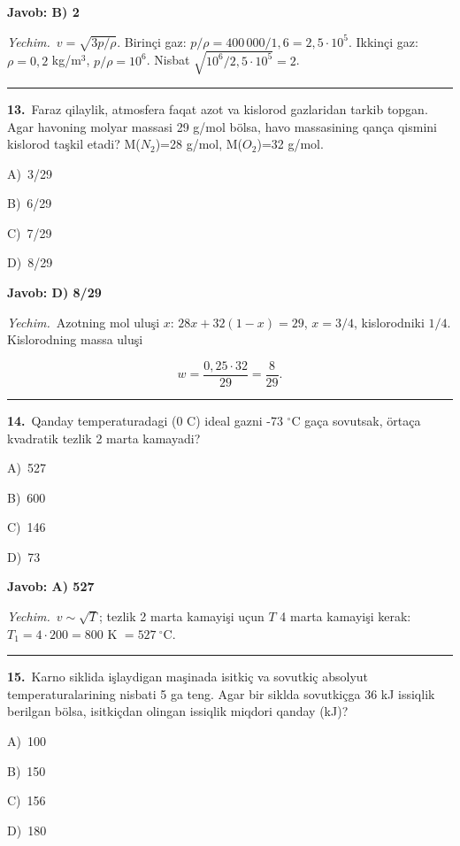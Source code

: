 \documentclass[11pt,a4paper]{article}
\newcommand{\opt}[2]{\hspace*{4mm}#1)\ #2\par}
\begin{document}
\noindent\colorbox{gray!12}{\parbox{\dimexpr\linewidth-2\fboxsep}{\textbf{Javob: B) 2}}}\par\smallskip
\noindent\textit{Yechim.}\ $v=\sqrt{3p/\rho}$. Birinçi gaz: $p/\rho=400\,000/1{,}6=2{,}5\cdot10^5$. Ikkinçi gaz: $\rho=0{,}2$ kg/m$^3$, $p/\rho=10^6$. Nisbat $\sqrt{10^6/2{,}5\cdot10^5}=2$.\par\par\medskip\hrule\medskip
{}\noindent\begin{minipage}{\linewidth}
\textbf{13.}\ Faraz qilaylik, atmosfera faqat azot va kislorod gazlaridan tarkib topgan. Agar havoning molyar massasi 29 g/mol bölsa, havo massasining qança qismini kislorod taşkil etadi? M($N_2$)=28 g/mol, M($O_2$)=32 g/mol.\par\smallskip
\opt{A}{3/29}
\opt{B}{6/29}
\opt{C}{7/29}
\opt{D}{8/29}
\end{minipage}\vspace{2pt}\par
\noindent\colorbox{gray!12}{\parbox{\dimexpr\linewidth-2\fboxsep}{\textbf{Javob: D) 8/29}}}\par\smallskip
\noindent\textit{Yechim.}\ Azotning mol uluşi $x$: $28x+32(1-x)=29$, $x=3/4$, kislorodniki $1/4$. Kislorodning massa uluşi\par
\[w=\frac{0{,}25\cdot32}{29}=\frac{8}{29}.\]\par\medskip\hrule\medskip
{}\noindent\begin{minipage}{\linewidth}
\textbf{14.}\ Qanday temperaturadagi (0 C) ideal gazni -73 $^\circ$C gaça sovutsak, örtaça kvadratik tezlik 2 marta kamayadi?\par\smallskip
\opt{A}{527}
\opt{B}{600}
\opt{C}{146}
\opt{D}{73}
\end{minipage}\vspace{2pt}\par
\noindent\colorbox{gray!12}{\parbox{\dimexpr\linewidth-2\fboxsep}{\textbf{Javob: A) 527}}}\par\smallskip
\noindent\textit{Yechim.}\ $v\sim\sqrt T$; tezlik 2 marta kamayişi uçun $T$ 4 marta kamayişi kerak: $T_1=4\cdot200=800$ K $=527\ ^\circ$C.\par\par\medskip\hrule\medskip
{}\noindent\begin{minipage}{\linewidth}
\textbf{15.}\ Karno siklida işlaydigan maşinada isitkiç va sovutkiç absolyut temperaturalarining nisbati 5 ga teng. Agar bir siklda sovutkiçga 36 kJ issiqlik berilgan bölsa, isitkiçdan olingan issiqlik miqdori qanday (kJ)?\par\smallskip
\opt{A}{100}
\opt{B}{150}
\opt{C}{156}
\opt{D}{180}
\end{minipage}\vspace{2pt}\par
\end{document}
